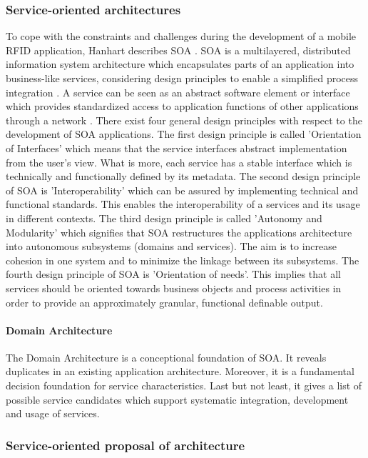 \subsubsection{Service-oriented architectures}

To cope with the constraints and challenges during the development of a mobile RFID application, Hanhart describes \ac{SOA} \cite[p.31 ff.]{mobile}. SOA is a multilayered, distributed information system architecture which encapsulates parts of an application into business-like services, considering design principles to enable a simplified process integration \cite[p.32]{mobile}. A service can be seen as an abstract software element or interface which provides standardized access to application functions of other applications through a network \cite[p.32]{mobile}. There exist four general design principles with respect to the development of SOA applications. The first design principle is called 'Orientation of Interfaces' which means that the service interfaces abstract implementation from the user's view. What is more, each service has a stable interface which is technically and functionally defined by its metadata. The second design principle of SOA is 'Interoperability' which can be assured by implementing technical and functional standards. This enables the interoperability of a services and its usage in different contexts. The third design principle is called 'Autonomy and Modularity' which signifies that SOA restructures the applications architecture into autonomous subsystems (domains and services). The aim is to increase cohesion in one system and to minimize the linkage between its subsystems. The fourth design principle of SOA is 'Orientation of needs'. This implies that all services should be oriented towards business objects and process activities in order to provide an approximately granular, functional definable output. 

\paragraph{Domain Architecture}

The Domain Architecture is a conceptional foundation of SOA. It reveals duplicates in an existing application architecture. Moreover, it is a fundamental decision foundation for service characteristics. Last but not least, it gives a list of possible service candidates which support systematic integration, development and usage of services.

\subsubsection{Service-oriented proposal of architecture}

